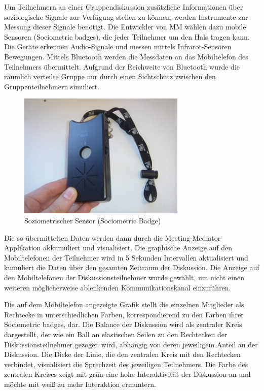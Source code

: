 Um Teilnehmern an einer Gruppendiskussion zusätzliche Informationen über
soziologische Signale zur Verfügung stellen zu können, werden Instrumente zur
Messung dieser Signale benötigt. Die Entwickler von MM wählen dazu mobile
Sensoren (Sociometric badges), die jeder Teilnehmer um den Hals tragen kann.
Die Geräte erkennen Audio-Signale und messen mittels Infrarot-Sensoren
Bewegungen. Mittels Bluetooth werden die Messdaten an das Mobiltelefon des
Teilnehmers übermittelt. Aufgrund der Reichweite von Bluetooth wurde die
räumlich verteilte Gruppe nur durch einen Sichtschutz zwischen den
Gruppenteilnehmern simuliert.

\begin{figure}[htp]
\centering
\includegraphics[width=8cm]{sociometricbadge.jpg}
\caption{Soziometrischer Sensor (Sociometric Badge)}
\end{figure}

Die so übermittelten Daten werden dann durch die Meeting-Mediator-Applikation
akkumuliert und visualisiert.
Die graphische Anzeige auf den Mobiltelefonen der Teilnehmer wird in 5 Sekunden
Intervallen aktualisiert und kumuliert die Daten über den gesamten Zeitraum der
Diskussion.
Die Anzeige auf den Mobiltelefonen der Diskussionsteilnehmer wurde gewählt, um
nicht einen weiteren mög\-li\-cher\-wei\-se ablenkenden Kommunikationskanal
einzuführen.

Die auf dem Mobiltelefon angezeigte Grafik stellt die einzelnen Mitglieder als
Rechtecke in unterschiedlichen Farben, korrespondierend zu den Farben ihrer
Sociometric badges, dar. Die Balance der Diskussion wird als zentraler Kreis
dargestellt, der wie ein Ball an elastischen Seilen zu den Rechtecken der
Diskussionsteilnehmer gezogen wird, abhängig von deren jeweiligem Anteil an der
Diskussion. Die Dicke der Linie, die den zentralen Kreis mit den Rechtecken
verbindet, visualisiert die Sprechzeit des jeweiligen Teilnehmers. Die Farbe des
zentralen Kreises zeigt mit grün eine hohe Interaktivität der Diskussion an und
möchte mit weiß zu mehr Interaktion ermuntern.

